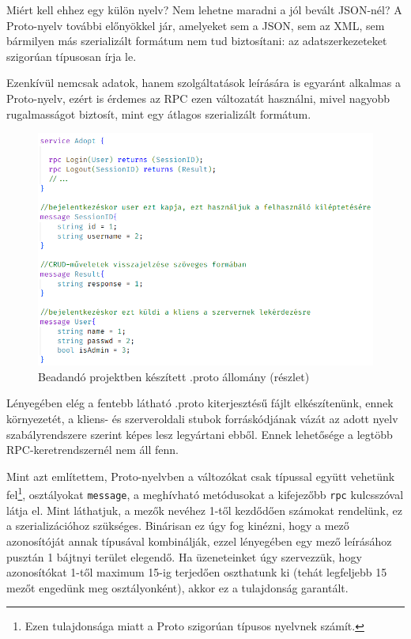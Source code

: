 \documentclass[tocnopagenum]{thesis-ekf}
\theoremstyle{definition}
\theoremstyle{remark}
\begin{document}
	Miért kell ehhez egy külön nyelv? Nem lehetne maradni a jól bevált JSON-nél? A Proto-nyelv további előnyökkel jár, amelyeket sem a JSON, sem az XML, sem bármilyen  más szerializált formátum nem tud biztosítani: az adatszerkezeteket szigorúan típusosan írja le.
	
	Ezenkívül nemcsak adatok, hanem szolgáltatások leírására is egyaránt alkalmas a Proto-nyelv, ezért is érdemes az RPC ezen változatát használni, mivel nagyobb rugalmasságot biztosít, mint egy átlagos szerializált formátum.
	\begin{figure}[h]
		\centering
		\includegraphics[scale=0.4]{protobuf}
		\caption{Beadandó projektben készített .proto állomány (részlet)}
		\label{fig:protobuf}
	\end{figure}
	
	Lényegében elég a fentebb látható .proto kiterjesztésű fájlt elkészítenünk, ennek környezetét, a kliens- és szerveroldali stubok forráskódjának vázát az adott nyelv szabályrendszere szerint képes lesz legyártani ebből. Ennek lehetősége a legtöbb RPC-keretrendszernél nem áll fenn.
	
	Mint azt említettem, Proto-nyelvben a változókat csak típussal együtt vehetünk fel\footnote{Ezen tulajdonsága miatt a Proto szigorúan típusos nyelvnek számít.}, osztályokat \verb*|message|, a meghívható metódusokat a kifejezőbb \verb*|rpc| kulcsszóval látja el. Mint láthatjuk, a mezők nevéhez 1-től kezdődően számokat rendelünk, ez a szerializációhoz szükséges. Binárisan ez úgy fog kinézni, hogy a mező azonosítóját annak típusával kombinálják, ezzel lényegében egy mező leírásához pusztán 1 bájtnyi terület elegendő. Ha üzeneteinket úgy szervezzük, hogy azonosítókat 1-től maximum 15-ig terjedően oszthatunk ki (tehát legfeljebb 15 mezőt engedünk meg osztályonként), akkor ez a tulajdonság garantált. 
	
\end{document}
